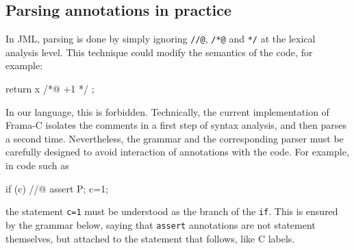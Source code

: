 \subsection{Parsing annotations in practice}

In JML, parsing is done by simply ignoring \verb|//@|, \verb|/*@| and
\verb|*/| at the lexical analysis level. This technique could modify the
semantics of the code, for example:
\begin{listing}{1}
return x /*@ +1 */ ;
\end{listing}
In our language, this is forbidden. Technically, the current
implementation of Frama-C isolates the comments in a first step of
syntax analysis, and then parses a second time. Nevertheless, the
grammar and the corresponding parser must be carefully designed to
avoid interaction of annotations with the code. For example, in code such as
\begin{listing}{1}
  if (c) //@ assert P;
     c=1;
\end{listing}
the statement \lstinline|c=1| must be understood as the
branch of the \texttt{if}. This is ensured by the grammar below,
saying that \lstinline|assert| annotations are not statement themselves,
but attached to the statement that follows, like C labels.
